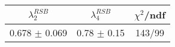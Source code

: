 \begin{tabular}{c|c||c}
$\lambda_{2}^{RSB}$ & $\lambda_4^{RSB}$ & $\chi^{2}$/ndf \\
\hline
0.678 $\pm$ 0.069 & 0.78 $\pm$ 0.15 & 143/99\\
\end{tabular}
